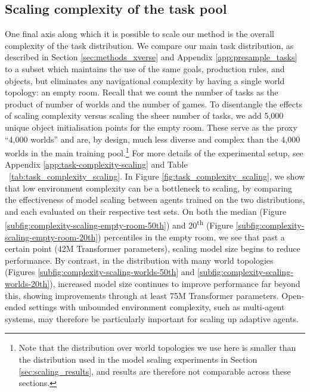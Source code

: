 \documentclass[11pt, a4paper, logo, copyright]{deepmind}
\begin{document}
\begin{appendix}
\subsection{Scaling complexity of the task pool}
\label{app:scaling_complexity}
One final axis along which it is possible to scale our method is the overall complexity of the task distribution. We compare our main task distribution, as described in Section \ref{sec:methods_xverse} and Appendix \ref{app:presample_tasks} to a subset which maintains the use of the same goals, production rules, and objects, but eliminates any navigational complexity by having a single world topology: an empty room. Recall that we count the number of tasks as the product of number of worlds and the number of games. To disentangle the effects of scaling complexity versus scaling the sheer number of tasks, we add 5,000 unique object initialisation points for the empty room. These serve as the proxy ``4,000 worlds'' and are, by design, much less diverse and complex than the 4,000 worlds in the main training pool.\footnote{Note that the distribution over world topologies we use here is smaller than the distribution used in the model scaling experiments in Section \ref{sec:scaling_results}, and results are therefore not comparable across these sections.} For more details of the experimental setup, see Appendix \ref{app:task-complexity-scaling} and Table ~\ref{tab:task_complexity_scaling}.
In Figure \ref{fig:task_complexity_scaling}, we show that low environment complexity can be a bottleneck to scaling, by comparing the effectiveness of model scaling between agents trained on the two distributions, and each evaluated on their respective test sets. On both the median (Figure \ref{subfig:complexity-scaling-empty-room-50th}) and 20\textsuperscript{th} (Figure \ref{subfig:complexity-scaling-empty-room-20th}) percentiles in the empty room, we see that past a certain point (42M Transformer parameters), scaling model size begins to reduce performance. By contrast, in the distribution with many world topologies (Figures \ref{subfig:complexity-scaling-worlds-50th} and \ref{subfig:complexity-scaling-worlds-20th}), increased model size continues to improve performance far beyond this, showing improvements through at least 75M Transformer parameters.
Open-ended settings with unbounded environment complexity, such as multi-agent systems, may therefore be particularly important for scaling up adaptive agents.
\begin{figure}[t!]
    \centering
    \begin{subfigure}[b]{0.49\textwidth}

\end{subfigure}
\end{figure}
\end{appendix}
\end{document}
